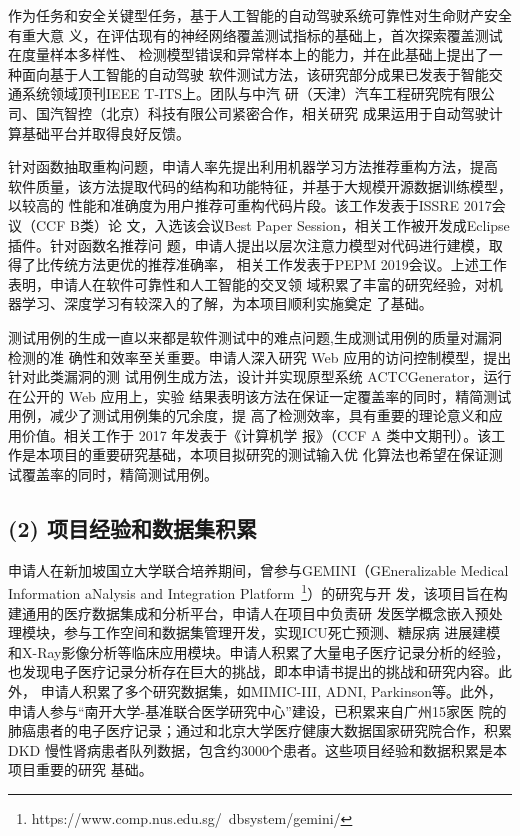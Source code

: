 \documentclass[a4paper,zihao=-4]{article}
\begin{document}
作为任务和安全关键型任务，基于人工智能的自动驾驶系统可靠性对生命财产安全有重大意
义，在评估现有的神经网络覆盖测试指标的基础上，首次探索覆盖测试在度量样本多样性、
检测模型错误和异常样本上的能力，并在此基础上提出了一种面向基于人工智能的自动驾驶
软件测试方法，该研究部分成果已发表于智能交通系统领域顶刊IEEE T-ITS上。团队与中汽
研（天津）汽车工程研究院有限公司、国汽智控（北京）科技有限公司紧密合作，相关研究
成果运用于自动驾驶计算基础平台并取得良好反馈。
	
针对函数抽取重构问题，申请人率先提出利用机器学习方法推荐重构方法，提高
软件质量，该方法提取代码的结构和功能特征，并基于大规模开源数据训练模型，以较高的
性能和准确度为用户推荐可重构代码片段。该工作发表于ISSRE 2017会议（CCF B类）论
文，入选该会议Best Paper Session，相关工作被开发成Eclipse插件。针对函数名推荐问
题，申请人提出以层次注意力模型对代码进行建模，取得了比传统方法更优的推荐准确率，
相关工作发表于PEPM 2019会议。上述工作表明，申请人在软件可靠性和人工智能的交叉领
域积累了丰富的研究经验，对机器学习、深度学习有较深入的了解，为本项目顺利实施奠定
了基础。

测试用例的生成一直以来都是软件测试中的难点问题,生成测试用例的质量对漏洞检测的准
确性和效率至关重要。申请人深入研究 Web 应用的访问控制模型，提出针对此类漏洞的测
试用例生成方法，设计并实现原型系统 ACTCGenerator，运行在公开的 Web 应用上，实验
结果表明该方法在保证一定覆盖率的同时，精简测试用例，减少了测试用例集的冗余度，提
高了检测效率，具有重要的理论意义和应用价值。相关工作于 2017 年发表于《计算机学
报》（CCF A 类中文期刊）。该工作是本项目的重要研究基础，本项目拟研究的测试输入优
化算法也希望在保证测试覆盖率的同时，精简测试用例。




\subsection*{(2) 项目经验和数据集积累}

申请人在新加坡国立大学联合培养期间，曾参与GEMINI（GEneralizable Medical
Information aNalysis and Integration
Platform~\footnote{https://www.comp.nus.edu.sg/~dbsystem/gemini/}）的研究与开
发，该项目旨在构建通用的医疗数据集成和分析平台，{\kaishu 申请人在项目中负责研
发医学概念嵌入预处理模块，参与工作空间和数据集管理开发，实现ICU死亡预测、糖尿病
进展建模和X-Ray影像分析等临床应用模块}。申请人积累了大量电子医疗记录分析的经验，
也发现电子医疗记录分析存在巨大的挑战，即本申请书提出的挑战和研究内容。此外，
{\kaishu 申请人积累了多个研究数据集，如MIMIC-III, ADNI, Parkinson等}。此外，
{\kaishu 申请人参与“南开大学-基准联合医学研究中心”建设}，已积累来自广州15家医
院的肺癌患者的电子医疗记录；通过和北京大学医疗健康大数据国家研究院合作，积累DKD
慢性肾病患者队列数据，包含约3000个患者。这些项目经验和数据积累是本项目重要的研究
基础。
\end{document}
